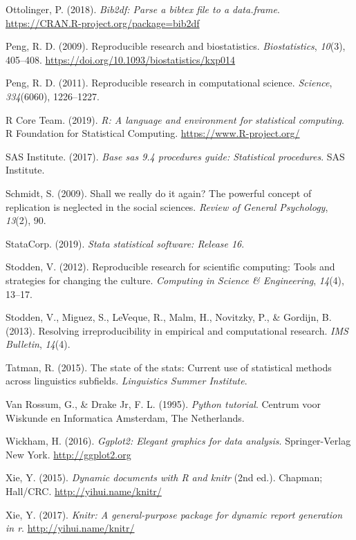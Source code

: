 \documentclass[
  english,
  ,man]{apa7}
\newlength{\cslhangindent}
\newenvironment{cslreferences}%
  {\setlength{\parindent}{0pt}%
  \everypar{\setlength{\hangindent}{\cslhangindent}}\ignorespaces}%
  {\par}
\begin{document}
\begin{cslreferences}
\leavevmode\hypertarget{ref-bib2df}{}%
Ottolinger, P. (2018). \emph{Bib2df: Parse a bibtex file to a data.frame}. \url{https://CRAN.R-project.org/package=bib2df}

\leavevmode\hypertarget{ref-peng2009}{}%
Peng, R. D. (2009). Reproducible research and biostatistics. \emph{Biostatistics}, \emph{10}(3), 405--408. \url{https://doi.org/10.1093/biostatistics/kxp014}

\leavevmode\hypertarget{ref-peng2011}{}%
Peng, R. D. (2011). Reproducible research in computational science. \emph{Science}, \emph{334}(6060), 1226--1227.

\leavevmode\hypertarget{ref-rpro}{}%
R Core Team. (2019). \emph{R: A language and environment for statistical computing}. R Foundation for Statistical Computing. \url{https://www.R-project.org/}

\leavevmode\hypertarget{ref-sas2017base}{}%
SAS Institute. (2017). \emph{Base sas 9.4 procedures guide: Statistical procedures}. SAS Institute.

\leavevmode\hypertarget{ref-schmidt2009}{}%
Schmidt, S. (2009). Shall we really do it again? The powerful concept of replication is neglected in the social sciences. \emph{Review of General Psychology}, \emph{13}(2), 90.

\leavevmode\hypertarget{ref-stata}{}%
StataCorp. (2019). \emph{Stata statistical software: Release 16}.

\leavevmode\hypertarget{ref-stodden2012}{}%
Stodden, V. (2012). Reproducible research for scientific computing: Tools and strategies for changing the culture. \emph{Computing in Science \& Engineering}, \emph{14}(4), 13--17.

\leavevmode\hypertarget{ref-stodden2013}{}%
Stodden, V., Miguez, S., LeVeque, R., Malm, H., Novitzky, P., \& Gordijn, B. (2013). Resolving irreproducibility in empirical and computational research. \emph{IMS Bulletin}, \emph{14}(4).

\leavevmode\hypertarget{ref-tatman2015}{}%
Tatman, R. (2015). The state of the stats: Current use of statistical methods across linguistics subfields. \emph{Linguistics Summer Institute}.

\leavevmode\hypertarget{ref-van1995python}{}%
Van Rossum, G., \& Drake Jr, F. L. (1995). \emph{Python tutorial}. Centrum voor Wiskunde en Informatica Amsterdam, The Netherlands.

\leavevmode\hypertarget{ref-ggplot2}{}%
Wickham, H. (2016). \emph{Ggplot2: Elegant graphics for data analysis}. Springer-Verlag New York. \url{http://ggplot2.org}

\leavevmode\hypertarget{ref-knitr}{}%
Xie, Y. (2015). \emph{Dynamic documents with R and knitr} (2nd ed.). Chapman; Hall/CRC. \url{http://yihui.name/knitr/}

\leavevmode\hypertarget{ref-knitrmanual}{}%
Xie, Y. (2017). \emph{Knitr: A general-purpose package for dynamic report generation in r}. \url{http://yihui.name/knitr/}
\end{cslreferences}
\end{document}
